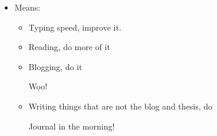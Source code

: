 \documentclass[12pt]{article}
\renewcommand{\,}{\textsuperscript{,}}
\begin{document}
\begin{itemize}
\begin{itemize}
\begin{itemize}
\item Handwriting, pick and make the new one

I've decided that, since some amount of ink stays in the nib\footnote{honestly, a shocking amount. I think that I can write three full pages} when I empty it, journaling in an analog sense could be useful each morning

\end{itemize}

\item Means:

\begin{itemize}

\item Typing speed, improve it.

\item Reading, do more of it

\item Blogging, do it

Woo!

\item Writing things that are not the blog and thesis, do

Journal in the morning!

\end{itemize}

\end{itemize}

\end{itemize}
\end{document}
